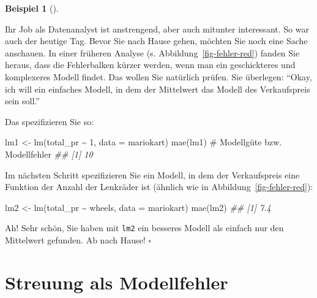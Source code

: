\documentclass[
  letterpaper,
  twoside,
  open=any]{scrbook}
\newenvironment{Shaded}{\begin{snugshade}}{\end{snugshade}}
\newcommand{\AttributeTok}[1]{\textcolor[rgb]{0.40,0.45,0.13}{#1}}
\newcommand{\CommentTok}[1]{\textcolor[rgb]{0.37,0.37,0.37}{#1}}
\newcommand{\DecValTok}[1]{\textcolor[rgb]{0.68,0.00,0.00}{#1}}
\newcommand{\DocumentationTok}[1]{\textcolor[rgb]{0.37,0.37,0.37}{\textit{#1}}}
\newcommand{\FunctionTok}[1]{\textcolor[rgb]{0.28,0.35,0.67}{#1}}
\newcommand{\NormalTok}[1]{\textcolor[rgb]{0.00,0.23,0.31}{#1}}
\newcommand{\OtherTok}[1]{\textcolor[rgb]{0.00,0.23,0.31}{#1}}
\newcommand{\SpecialCharTok}[1]{\textcolor[rgb]{0.37,0.37,0.37}{#1}}
\theoremstyle{definition}
\theoremstyle{definition}
\newtheorem{example}{Beispiel}[chapter]
\theoremstyle{definition}
\theoremstyle{remark}
\begin{document}
\begin{example}[]\protect\hypertarget{exm-gruppen-mw}{}\label{exm-gruppen-mw}

Ihr Job als Datenanalyst ist anstrengend, aber auch mitunter
interessant. So war auch der heutige Tag. Bevor Sie nach Hause gehen,
möchten Sie noch eine Sache anschauen. In einer früheren Analyse (s.
Abbildung~\ref{fig-fehler-red}) fanden Sie heraus, dass die Fehlerbalken
kürzer werden, wenn man ein geschickteres und komplexeres Modell findet.
Das wollen Sie natürlich prüfen. Sie überlegen: \enquote{Okay, ich will
ein einfaches Modell, in dem der Mittelwert das Modell des Verkaufspreis
sein soll.}

Das spezifizieren Sie so:

\begin{Shaded}
\begin{Highlighting}[]
\NormalTok{lm1 }\OtherTok{\textless{}{-}} \FunctionTok{lm}\NormalTok{(total\_pr }\SpecialCharTok{\textasciitilde{}} \DecValTok{1}\NormalTok{, }\AttributeTok{data =}\NormalTok{ mariokart)}
\FunctionTok{mae}\NormalTok{(lm1)  }\CommentTok{\# Modellgüte bzw. Modellfehler}
\DocumentationTok{\#\# [1] 10}
\end{Highlighting}
\end{Shaded}

Im nächsten Schritt spezifizieren Sie ein Modell, in dem der
Verkaufspreis eine Funktion der Anzahl der Lenkräder ist (ähnlich wie in
Abbildung~\ref{fig-fehler-red}):

\begin{Shaded}
\begin{Highlighting}[]
\NormalTok{lm2 }\OtherTok{\textless{}{-}} \FunctionTok{lm}\NormalTok{(total\_pr }\SpecialCharTok{\textasciitilde{}}\NormalTok{ wheels, }\AttributeTok{data =}\NormalTok{ mariokart)}
\FunctionTok{mae}\NormalTok{(lm2)}
\DocumentationTok{\#\# [1] 7.4}
\end{Highlighting}
\end{Shaded}

Ah! Sehr schön, Sie haben mit \texttt{lm2} ein besseres Modell als
einfach nur den Mittelwert gefunden. Ab nach Hause! \(\square\)

\end{example}

\section{Streuung als Modellfehler}\label{streuung-als-modellfehler}
\end{document}

